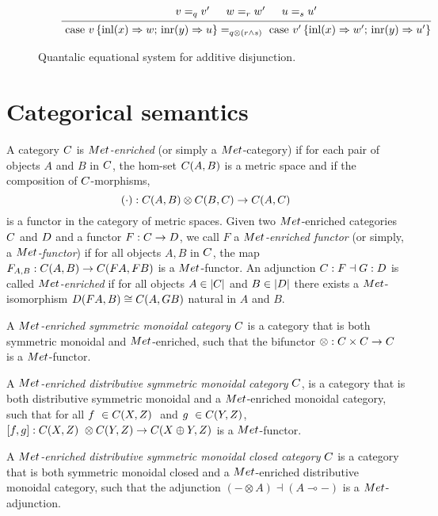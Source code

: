 \documentclass[a4paper,UKenglish,cleveref, autoref, thm-restate]{lipics-v2021}
\begin{document}
\begin{figure}[h!]
\begin{equation*}
    \end{equation*}
    \begin{equation*}
    \hspace{20pt}
   \begin{prooftree}
      \hypo{ v =_{q} v' }
      \hypo{w=_{r} w'}
      \hypo{u=_{s}u'}
      \infer3[]{\text{ case } v \,   \{\text{inl} (x) \Rightarrow w ; \, \text{inr} (y) \Rightarrow u\} =_{q\otimes(r \wedge s)} \text{ case } v' \,  \{\text{inl} (x) \Rightarrow w' ; \,\text{inr} (y) \Rightarrow u'\} }
  \end{prooftree}
    \end{equation*}
    \caption{Quantalic equational system for additive disjunction.}
    \label{fig:equations-in-context-cond}
    \end{figure}
\section{Categorical semantics}
\begin{definition}
 A category $\catC$ is $\catMet$\emph{-enriched} (or simply a $\catMet$-category) if for each pair of objects $A$ and $B$ in $\catC$, the hom-set $\catC(A, B)$ is a metric space and if the composition of $\catC$-morphisms,
 $$(\comp): \catC(A, B) \otimes \catC(B, C) \rightarrow \catC(A, C)$$
 is a functor in the category of metric spaces. 
 Given two $\catMet$-enriched categories $\catC$ and $\catD$ and a functor $F : \catC\to \catD$, we call 
$F$ a \emph{$\catMet$-enriched functor} (or simply, a \emph{$\catMet$-functor}) if for all objects $A, B$ in $\catC$, 
the map $F_{A,B} : \catC(A,B) \to \catC(FA, FB)$ is a $\catMet$-functor. 
An adjunction $\catC : F \dashv G : \catD$ is called \emph{$\catMet$-enriched} if for all objects $A \in |\catC|$ 
and $B \in |\catD|$ there exists a $\catMet$-isomorphism
$\catD(FA, B) \cong \catC(A, GB)$
natural in $A$ and $B$.
\end{definition}


\begin{definition}
A \emph{$\catMet$-enriched symmetric monoidal category} $\catC$ is a category that is both symmetric monoidal and $\catMet$-enriched, such that the bifunctor
$\otimes : \catC \times \catC \to \catC$
is a $\catMet$-functor. 

A  \emph{$\catMet$-enriched distributive symmetric monoidal category} $\catC$, is a category that is both distributive symmetric monoidal and a $\catMet$-enriched monoidal category, such that for all $f  \in \catC(X,Z)  $ and $g  \in \catC(Y,Z) $, $ [f,g]:\catC(X,Z)  \otimes \catC(Y,Z) \rightarrow \catC(X \oplus Y,Z) $ is a $\catMet$-functor.

A \emph{$\catMet$-enriched distributive symmetric monoidal closed category} $\catC$ is a category that is both symmetric monoidal closed and a $\catMet$-enriched distributive monoidal category, such that the adjunction
$(- \otimes A) \dashv (A \multimap -)$
is a $\catMet$-adjunction.
\end{definition}
\end{document}
